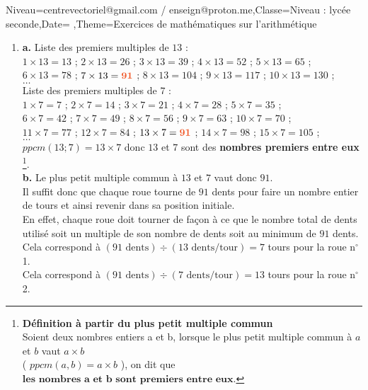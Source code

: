 \documentclass[a4paper,11pt,fleqn]{article}
\begin{document}
\begin{Maquette}[Fiche]{Niveau=centrevectoriel@gmail.com / enseign@proton.me,Classe=Niveau :  lycée seconde,Date=   ,Theme=Exercices de mathématiques  sur l'arithmétique }
\begin{Solution}
\begin{enumerate}[itemsep=1em]
	\item \textbf {a.}  Liste des premiers multiples de $13$ : \\$1\times13 = 13$ ; $2\times13 = 26$ ; $3\times13 = 39$ ; $4\times13 = 52$ ; $5\times13 = 65$ ; \\$6\times13 = 78$ ; $7\times13 = {\color[HTML]{f15929}\boldsymbol{91}}$ ; $8\times13 = 104$ ; $9\times13 = 117$ ; $10\times13 = 130$ ; \\$\ldots$ \\ Liste des premiers multiples de $7$ : \\$1\times7 = 7$ ; $2\times7 = 14$ ; $3\times7 = 21$ ; $4\times7 = 28$ ; $5\times7 = 35$ ; \\$6\times7 = 42$ ; $7\times7 = 49$ ; $8\times7 = 56$ ; $9\times7 = 63$ ; $10\times7 = 70$ ; \\$11\times7 = 77$ ; $12\times7 = 84$ ; $13\times7 = {\color[HTML]{f15929}\boldsymbol{91}}$ ; $14\times7 = 98$ ; $15\times7 = 105$ ; \\$\ldots$ \\$ppcm(13;7)=13\times7$ donc $13$ et $7$ sont des \textbf{nombres premiers entre eux} \footnote{\textbf{Définition à partir du plus petit multiple commun} \\ Soient deux nombres entiers a et b, lorsque le plus petit multiple commun à $a$ et $b$ vaut $a \times b$ \\( $ppcm(a,b)=a\times b$ ), on dit que $\textbf{les nombres a et b sont premiers entre eux}$.}.\\\textbf {b.}  Le plus petit multiple commun à $13$ et $7$ vaut donc $91$.\\
            Il suffit donc que chaque roue tourne de $91$ dents pour faire un nombre entier de tours et ainsi revenir dans sa position initiale.\\
            En effet, chaque roue doit tourner de façon à ce que le nombre total de dents utilisé soit un multiple de son nombre
            de dents soit au minimum de $91$ dents.\\ Cela correspond à $(91\text{ dents})\div (13\text{ dents/tour}) = 7$ tours pour la roue n$^\circ$1.\\Cela correspond à $(91\text{ dents})\div (7\text{ dents/tour}) = 13$ tours pour la roue n$^\circ$2.

\end{enumerate}
\end{Solution}
\end{Maquette}
\end{document}
